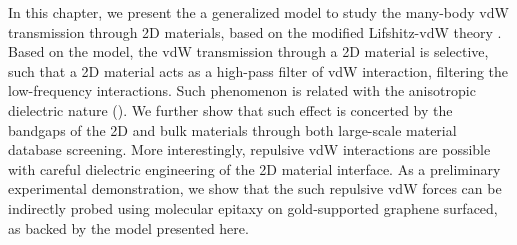 In this chapter, we present
the a generalized model to study the many-body vdW transmission
through 2D materials, based on the modified Lifshitz-vdW theory
\cite{Dzyaloshinskii_1961_lifshitz,parsegian_van_2010_book}.
%
Based on the model, the vdW transmission through a 2D material is
selective, such that a 2D material acts as a high-pass filter of vdW
interaction, filtering the low-frequency interactions.
%
Such phenomenon is related with the anisotropic dielectric nature ().
%
We further show that such effect is concerted by the bandgaps of the
2D and bulk materials through both large-scale material database
screening.
%
More interestingly, repulsive vdW interactions are possible with careful dielectric engineering of the 2D material interface.
%
As a preliminary experimental demonstration, we show that the such
repulsive vdW forces can be indirectly probed using molecular epitaxy
on gold-supported graphene surfaced, as backed by the model presented
here.

